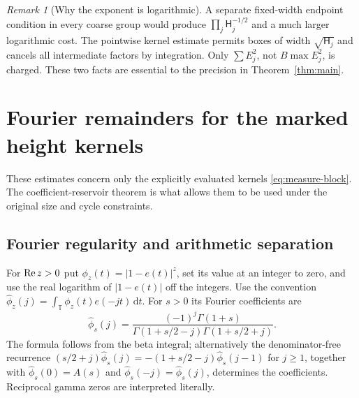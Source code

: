 \documentclass[11pt]{article}
\theoremstyle{definition}\newtheorem{definition}[theorem]{Definition}
\theoremstyle{remark}\newtheorem{remark}[theorem]{Remark}
\newcommand{\T}{\mathbb T}\newcommand{\R}{\mathbb R}\newcommand{\C}{\mathbb C}
\newcommand{\dd}{\,\mathrm d}\newcommand{\ind}{\mathbf1}
\numberwithin{equation}{section}\allowdisplaybreaks
\begin{document}
\begin{remark}[Why the exponent is logarithmic]
A separate fixed-width endpoint condition in every coarse group would
produce $\prod_j\mathsf H_j^{-1/2}$ and a much larger logarithmic cost.
The pointwise kernel estimate permits boxes of width
$\sqrt{\mathsf H_j}$ and cancels all intermediate factors by integration.
Only $\sum E_j^2$, not $B\max E_j^2$, is charged. These two facts are
essential to the precision in Theorem~\ref{thm:main}.
\end{remark}

\section{Fourier remainders for the marked height kernels}
\label{sec:fourier}
These estimates concern only the explicitly evaluated kernels
\eqref{eq:measure-block}. The coefficient-reservoir theorem is what
allows them to be used under the original size and cycle constraints.

\subsection{Fourier regularity and arithmetic separation}
For $\operatorname{Re} z>0$ put $\phi_z(t)=|1-e(t)|^z$, set its value at an integer
to zero, and use the real logarithm of $|1-e(t)|$ off the integers.
Use the convention $\widehat\phi_z(j)=\int_\T\phi_z(t)e(-jt)\dd t$.
For $s>0$ its Fourier coefficients are
\begin{equation}\label{eq:fourier-real}
 \widehat\phi_s(j)
 =\frac{(-1)^j\Gamma(1+s)}
 {\Gamma(1+s/2-j)\Gamma(1+s/2+j)}.
\end{equation}
The formula follows from the beta integral; alternatively the
denominator-free recurrence
$(s/2+j)\widehat\phi_s(j)=-(1+s/2-j)\widehat\phi_s(j-1)$ for $j\ge1$,
together with $\widehat\phi_s(0)=A(s)$ and
$\widehat\phi_s(-j)=\widehat\phi_s(j)$, determines the coefficients.
Reciprocal gamma zeros are interpreted literally.
\end{document}
